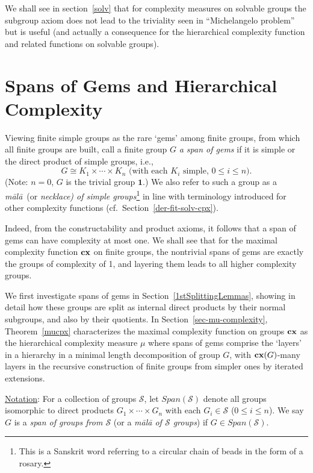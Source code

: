 \documentclass[a4paper,11pt]{amsart}
\theoremstyle{definition}
\newcommand{\cx}{\mbox{\bf cx}}
\newcommand{\1}{{\mathbf 1}}
\renewcommand{\S}{{\mathscr{S}}}
\newcommand{\Span}{Span}
\begin{document}
We shall see in section~\ref{solv} that for complexity measures on solvable groups the subgroup axiom does not lead to the triviality seen in ``Michelangelo problem'' but is useful (and actually a consequence for the hierarchical complexity function and related functions on solvable groups).   





\section{Spans of Gems and Hierarchical Complexity}



Viewing finite simple groups as the rare `gems' among finite groups, from which all finite groups are built,
call a finite group $G$ {\em a span of gems} if it is simple or the direct product of simple groups, i.e.,
$$G\cong K_1 \times \cdots \times K_n \mbox{ (with each $K_i$ simple, $0 \leq i \leq n$)}.$$
(Note: $n=0$, $G$ is the trivial group $\1$.)
We also refer to such a group as a {\em m\={a}l\={a}}\ (or  {\em necklace) of simple groups}\footnote{This is a Sanskrit word referring to a circular chain of beads in the form of a rosary.} in line with terminology introduced for other complexity functions (cf.~Section~\ref{der-fit-solv-cpx}).

 

Indeed, from the constructability and product axioms, it follows that a span of gems can have complexity at most one. 
We shall see that for the maximal complexity function $\cx$ on finite groups, the nontrivial spans of gems are exactly the groups of complexity of 1, and layering them leads to all higher complexity groups. 

We first investigate spans of gems in Section~\ref{1stSplittingLemmas},  showing in detail how these groups are split as internal direct products by their normal subgroups, and also by their quotients.  In Section~\ref{sec-mu-complexity}, Theorem~\ref{mucpx} characterizes the maximal complexity function on groups $\cx$ as the hierarchical complexity measure $\mu$ where spans of gems comprise the `layers' in a hierarchy in a minimal length decomposition of group $G$, with $\cx(G)$-many layers in the recursive construction of finite groups from simpler ones by iterated extensions. 


\noindent
\underline{Notation}: For  a collection of groups $\S$, let $\Span(\S)$ denote all groups isomorphic to direct products $G_1\times \cdots \times  G_n$ with each $G_i\in \S$ ($0 \leq i \leq n$).  We say $G$ is a {\em span of groups from $\S$} (or  a {\em m\={a}l\={a} of $\S$ groups})  if $G\in \Span(\S)$. 
\end{document}

